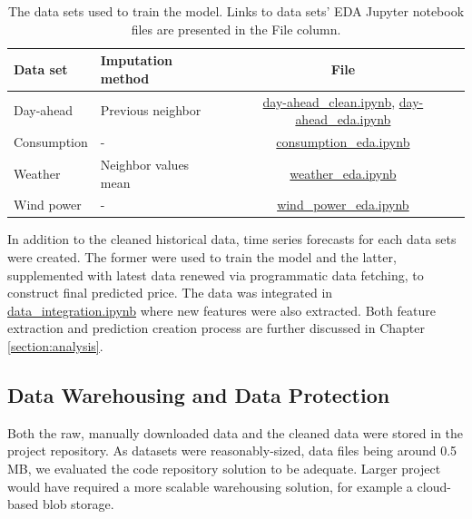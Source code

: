 \documentclass{article}
\begin{document}
\begin{table}[ht] 
\centering 
\begin{tabular}{l||l c} 
Data set & Imputation method & File\\ 
\hline \hline
Day-ahead & Previous neighbor & \href{https://github.com/IDS-mini/electricity/blob/main/data/day-ahead_clean.ipynb}{day-ahead\_clean.ipynb},  \href{https://github.com/IDS-mini/electricity/blob/main/data/day-ahead_eda.ipynb}{day-ahead\_eda.ipynb}\\
Consumption & - & \href{https://github.com/IDS-mini/electricity/blob/main/data/consumption_eda.ipynb}{consumption\_eda.ipynb} \\
Weather & Neighbor values mean & \href{https://github.com/IDS-mini/electricity/blob/main/data/weather_eda.ipynb}{weather\_eda.ipynb} \\
Wind power & - & \href{https://github.com/IDS-mini/electricity/blob/main/data/wind_power_eda.ipynb}{wind\_power\_eda.ipynb}\\
\hline
\end{tabular}
\caption{The data sets used to train the model. Links to data sets' EDA Jupyter notebook files are presented in the File column.}
\label{table:eda}
\end{table}

In addition to the cleaned historical data, time series forecasts for each data sets were created. The former were used to train the model and the latter, supplemented with latest data renewed via programmatic data fetching, to construct final predicted price. The data was integrated in \href{https://github.com/IDS-mini/electricity/blob/main/data/data_integration.ipynb}{data\_integration.ipynb} where new features were also extracted. Both feature extraction and prediction creation process are further discussed in Chapter \ref{section:analysis}.



\subsection{Data Warehousing and Data Protection}
\label{subsection:warehousing}

Both the raw, manually downloaded data and the cleaned data were stored in the project repository. As datasets were reasonably-sized, data files being around 0.5 MB, we evaluated the code repository solution to be adequate. Larger project would have required a more scalable warehousing solution, for example a cloud-based blob storage.
\end{document}
